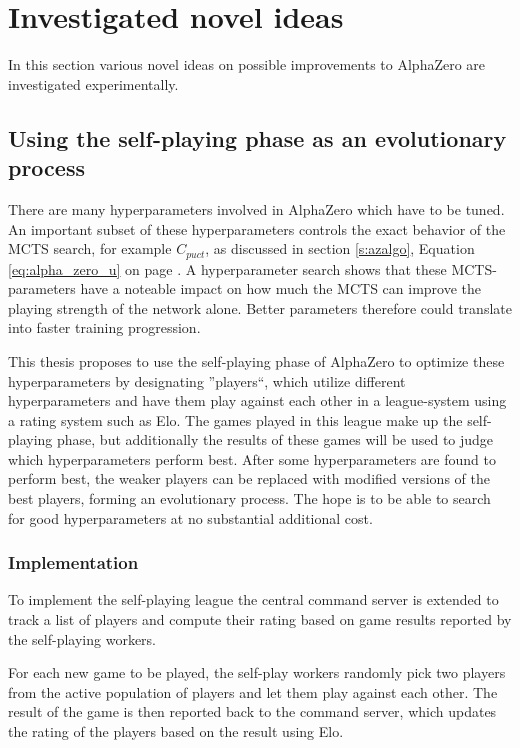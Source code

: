 \documentclass[12pt,onecolumn,oneside,titlepage]{article}
\begin{document}
\section{Investigated novel ideas}

In this section various novel ideas on possible improvements to AlphaZero are investigated experimentally.

\subsection{Using the self-playing phase as an evolutionary process} \label{s:novel_evolution}

There are many hyperparameters involved in AlphaZero which have to be tuned. An important subset of these hyperparameters controls the exact behavior of the MCTS search, for example $C_{puct}$, as discussed in section \ref{s:azalgo}, Equation \ref{eq:alpha_zero_u} on page \pageref{eq:alpha_zero_u}.
A hyperparameter search shows that these MCTS-parameters have a noteable impact on how much the MCTS can improve the playing strength of the network alone. Better parameters therefore could translate into faster training progression.

This thesis proposes to use the self-playing phase of AlphaZero to optimize these hyperparameters by designating ''players``, which utilize different hyperparameters and have them play against each other in a league-system using a rating system such as Elo. The games played 
in this league make up the self-playing phase, but additionally the results of these games will be used to judge which hyperparameters perform best. After some hyperparameters are found to perform best, the weaker players can be replaced with modified versions 
of the best players, forming an evolutionary process. The hope is to be able to search for good hyperparameters at no substantial additional cost.

\subsubsection{Implementation}

To implement the self-playing league the central command server is extended to track a list of players and compute their rating based on game results reported by the self-playing workers.

For each new game to be played, the self-play workers randomly pick two players from the active population of players and let them play against each other. The result of the game is then reported back to the command server, which updates the rating of the players based on the result using Elo.
\end{document}
